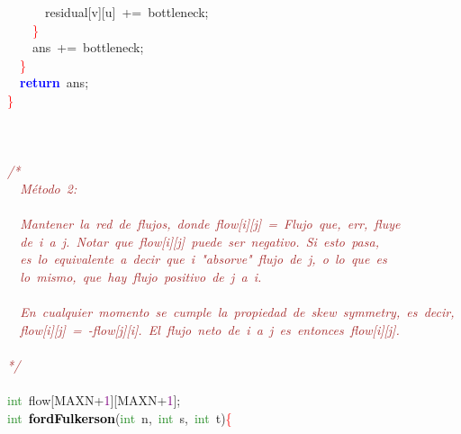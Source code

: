 {{\mbox{}\ \ \ \ \ \ residual\textcolor{BrickRed}{[}v\textcolor{BrickRed}{][}u\textcolor{BrickRed}{]}\ \textcolor{BrickRed}{+=}\ bottleneck\textcolor{BrickRed}{;} \\
\mbox{}\ \ \ \ \textcolor{Red}{\}} \\
\mbox{}\ \ \ \ ans\ \textcolor{BrickRed}{+=}\ bottleneck\textcolor{BrickRed}{;} \\
\mbox{}\ \ \textcolor{Red}{\}} \\
\mbox{}\ \ \textbf{\textcolor{Blue}{return}}\ ans\textcolor{BrickRed}{;} \\
\mbox{}\textcolor{Red}{\}} \\
\mbox{} \\
\mbox{} \\
\mbox{} \\
\mbox{}\textit{\textcolor{Brown}{/*}} \\
\mbox{}\textit{\textcolor{Brown}{\ \ Método\ 2:}} \\
\mbox{} \\
\mbox{}\textit{\textcolor{Brown}{\ \ Mantener\ la\ red\ de\ flujos,\ donde\ flow[i][j]\ =\ Flujo\ que,\ err,\ fluye}} \\
\mbox{}\textit{\textcolor{Brown}{\ \ de\ i\ a\ j.\ Notar\ que\ flow[i][j]\ puede\ ser\ negativo.\ Si\ esto\ pasa,}} \\
\mbox{}\textit{\textcolor{Brown}{\ \ es\ lo\ equivalente\ a\ decir\ que\ i\ "{}absorve"{}\ flujo\ de\ j,\ o\ lo\ que\ es}} \\
\mbox{}\textit{\textcolor{Brown}{\ \ lo\ mismo,\ que\ hay\ flujo\ positivo\ de\ j\ a\ i.}} \\
\mbox{} \\
\mbox{}\textit{\textcolor{Brown}{\ \ En\ cualquier\ momento\ se\ cumple\ la\ propiedad\ de\ skew\ symmetry,\ es\ decir,}} \\
\mbox{}\textit{\textcolor{Brown}{\ \ flow[i][j]\ =\ -flow[j][i].\ El\ flujo\ neto\ de\ i\ a\ j\ es\ entonces\ flow[i][j].}} \\
\mbox{} \\
\mbox{}\textit{\textcolor{Brown}{*/}} \\
\mbox{} \\
\mbox{}\textcolor{ForestGreen}{int}\ flow\textcolor{BrickRed}{[}MAXN\textcolor{BrickRed}{+}\textcolor{Purple}{1}\textcolor{BrickRed}{][}MAXN\textcolor{BrickRed}{+}\textcolor{Purple}{1}\textcolor{BrickRed}{];} \\
\mbox{}\textcolor{ForestGreen}{int}\ \textbf{\textcolor{Black}{fordFulkerson}}\textcolor{BrickRed}{(}\textcolor{ForestGreen}{int}\ n\textcolor{BrickRed}{,}\ \textcolor{ForestGreen}{int}\ s\textcolor{BrickRed}{,}\ \textcolor{ForestGreen}{int}\ t\textcolor{BrickRed}{)}\textcolor{Red}{\{} \\
}}
